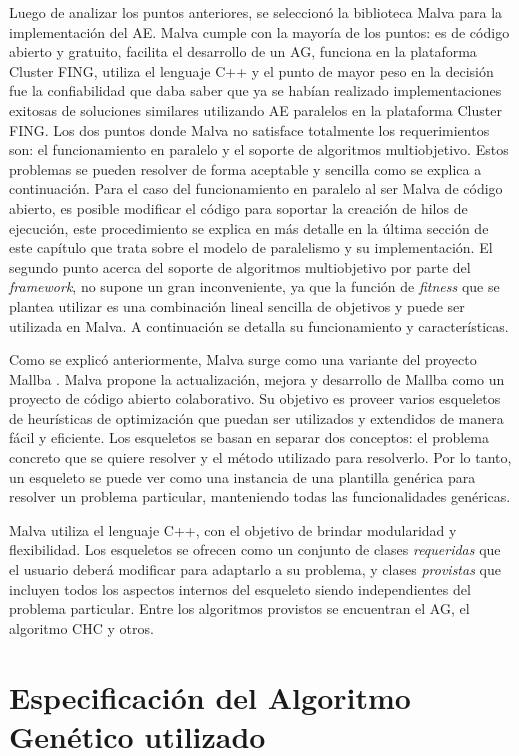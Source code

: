 Luego de analizar los puntos anteriores, se seleccionó la biblioteca Malva para la implementación del AE. Malva cumple con la mayoría de los puntos: es de código abierto y gratuito, facilita el desarrollo de un AG, funciona en la plataforma Cluster FING, utiliza el lenguaje C++ y el punto de mayor peso en la decisión fue la confiabilidad que daba saber que ya se habían realizado implementaciones exitosas de soluciones similares utilizando AE paralelos en la plataforma Cluster FING. Los dos puntos donde Malva no satisface totalmente los requerimientos son: el funcionamiento en paralelo y el soporte de algoritmos multiobjetivo. Estos problemas se pueden resolver de forma aceptable y sencilla como se explica a continuación. Para el caso del funcionamiento en paralelo al ser Malva de código abierto, es posible modificar el código para soportar la creación de hilos de ejecución, este procedimiento se explica en más detalle en la última sección de este capítulo que trata sobre el modelo de paralelismo y su implementación. El segundo punto acerca del soporte de algoritmos multiobjetivo por parte del \emph{framework}, no supone un gran inconveniente, ya que la función de \emph{fitness} que se plantea utilizar es una combinación lineal sencilla de objetivos y puede ser utilizada en Malva. A continuación se detalla su funcionamiento y características.

Como se explicó anteriormente, Malva \citep {Malva} surge como una variante del proyecto Mallba \citep{Mallba}. Malva propone la actualización, mejora y desarrollo de Mallba como un proyecto de código abierto colaborativo.  Su objetivo es proveer varios esqueletos de heurísticas de optimización que puedan ser utilizados y extendidos de manera fácil y eficiente. Los esqueletos se basan en separar dos conceptos: el problema concreto que se quiere resolver y el método utilizado para resolverlo. Por lo tanto, un esqueleto se puede ver como una instancia de una plantilla genérica para resolver un problema particular, manteniendo todas las funcionalidades genéricas.

Malva utiliza el lenguaje C++, con el objetivo de brindar modularidad y flexibilidad. Los esqueletos se ofrecen como un conjunto de clases \emph{requeridas} que el usuario deberá modificar para adaptarlo a su problema, y clases \emph{provistas} que incluyen todos los aspectos internos del esqueleto siendo  independientes del problema particular. Entre los algoritmos provistos se encuentran el AG, el algoritmo CHC \citep{CHC} y otros.


\section{Especificación del Algoritmo Genético utilizado}

